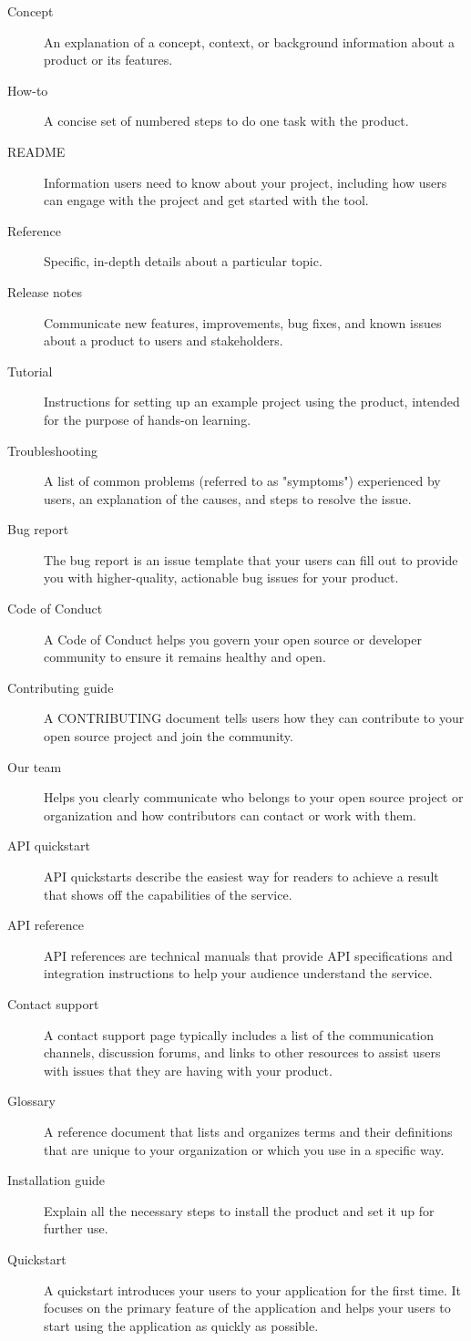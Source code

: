 \begin{description}
	\item[Concept] An explanation of a concept, context, or background information about a product or its features.
    \item[How-to] A concise set of numbered steps to do one task with the product.
    \item[README] Information users need to know about your project, including how users can engage with the project and get started with the tool.
    \item[Reference] Specific, in-depth details about a particular topic.
    \item[Release notes] Communicate new features, improvements, bug fixes, and known issues about a product to users and stakeholders.	
    \item[Tutorial] Instructions for setting up an example project using the product, intended for the purpose of hands-on learning.
    \item[Troubleshooting] A list of common problems (referred to as "symptoms") experienced by users, an explanation of the causes, and steps to resolve the issue.
    \item[Bug report] The bug report is an issue template that your users can fill out to provide you with higher-quality, actionable bug issues for your product.
    \item[Code of Conduct] A Code of Conduct helps you govern your open source or developer community to ensure it remains healthy and open.
    \item[Contributing guide] A CONTRIBUTING document tells users how they can contribute to your open source project and join the community.
    \item[Our team] Helps you clearly communicate who belongs to your open source project or organization and how contributors can contact or work with them.
    \item[API quickstart] API quickstarts describe the easiest way for readers to achieve a result that shows off the capabilities of the service.
    \item[API reference] API references are technical manuals that provide API specifications and integration instructions to help your audience understand the service.
    \item[Contact support] A contact support page typically includes a list of the communication channels, discussion forums, and links to other resources to assist users with issues that they are having with your product.
    \item[Glossary] A reference document that lists and organizes terms and their definitions that are unique to your organization or which you use in a specific way.
    \item[Installation guide] Explain all the necessary steps to install the product and set it up for further use.
    \item[Quickstart] A quickstart introduces your users to your application for the first time. It focuses on the primary feature of the application and helps your users to start using the application as quickly as possible.
\end{description}


